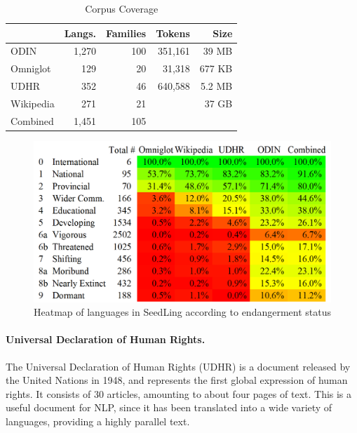 \begin{table}[t]
\small
\centering
    \begin{tabular}{l|rr|rr}
    ~         				& Langs. 	& Families 	& Tokens		& Size	\\ \hline
    ODIN      				& 1,270      & 100       		& 351,161		& 39 MB		\\
    Omniglot  				& 129        & 20        		& 31,318		& 677 KB	\\
    UDHR      				& 352        & 46        		& 640,588		& 5.2 MB	\\
    Wikipedia 				& 271        & 21       		&				& 37 GB\\ \hline
    Combined	    & 1,451	    & 105 
    \end{tabular}
\caption{Corpus Coverage}
\label{table:corpus}
\end{table}


\begin{figure}[t]
\begin{centering}
\includegraphics[scale=0.5]{heatmap2.png}
\caption{Heatmap of languages in SeedLing according to endangerment status}\label{fig:heatmap}
\end{centering}
\end{figure}


\paragraph{Universal Declaration of Human Rights.}

The Universal Declaration of Human Rights (UDHR) is a document released by the United Nations in 1948, and represents the first global expression of human rights. It consists of 30 articles, amounting to about four pages of text. This is a useful document for NLP, since it has been translated into a wide variety of languages, providing a highly parallel text.


